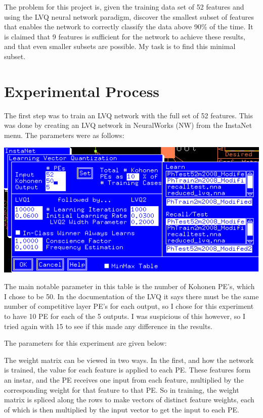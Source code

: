 \documentclass[12pt]{article}
\begin{document}
The problem for this project is, given the training data set of 52 features and using the LVQ neural network paradigm, discover the smallest subset of features that enables the network to correctly classify the data above 90\% of the time.  It is claimed that 9 features is sufficient for the network to achieve these results, and that even smaller subsets are possible.  My task is to find this minimal subset.

\section{Experimental Process}

The first step was to train an LVQ network with the full set of 52 features.  This was done by creating an LVQ network in NeuralWorks (NW) from the InstaNet menu.  The parameters were as follows:

\begin{center}
\includegraphics[scale=0.7]{parameters52features.png}
\end{center}

The main notable parameter in this table is the number of Kohonen PE's, which I chose to be 50.  In the documentation of the LVQ it says there must be the same number of competitive layer PE's for each output, so I chose for this experiment to have 10 PE for each of the 5 outputs.  I was suspicious of this however, so I tried again with 15 to see if this made any difference in the results.  

The parameters for this experiment are given below:





The weight matrix can be viewed in two ways.  In the first, and how the network is trained, the value for each feature is applied to each PE.  These features form an instar, and the PE receives one input from each feature, multiplied by the corresponding weight for that feature to that PE.  So in training, the weight matrix is spliced along the rows to make vectors of distinct feature weights, each of which is then multiplied by the input vector to get the input to each PE.
\end{document}

